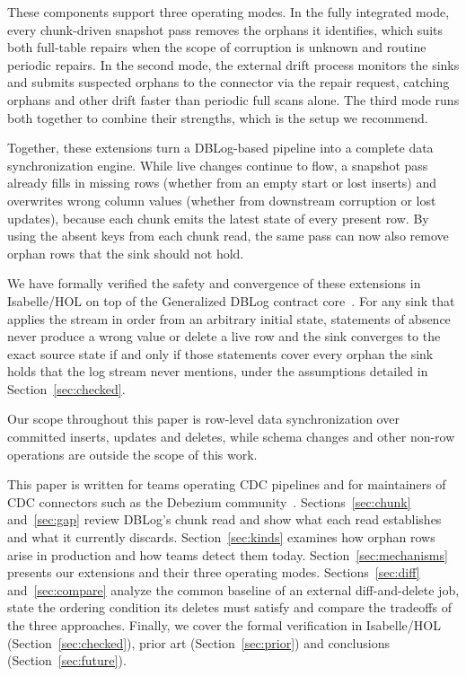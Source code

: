 \documentclass[sigconf,nonacm,10pt]{acmart}
\begin{document}
These components support three operating modes. In the fully integrated mode,
every chunk-driven snapshot pass removes the orphans it identifies, which suits
both full-table repairs when the scope of corruption is unknown and routine
periodic repairs. In the second mode, the external drift process monitors the
sinks and submits suspected orphans to the connector via the repair request,
catching orphans and other drift faster than periodic full scans alone. The
third mode runs both together to combine their strengths, which is the setup we
recommend.

Together, these extensions turn a DBLog-based pipeline into a complete data
synchronization engine. While live changes continue to flow, a snapshot pass already fills in missing rows (whether
from an empty start or lost inserts) and overwrites wrong column values (whether
from downstream corruption or lost updates), because each chunk emits the latest
state of every present row. By using the absent keys from each chunk read,
the same pass can now also remove orphan rows that the sink should not hold. 

We have formally verified the safety and convergence of these extensions in
Isabelle/HOL on top of the Generalized DBLog contract
core~\cite{andreakis2026generalized,generalized_dblog_artifact}. For any sink
that applies the stream in order from an arbitrary initial state, statements of
absence never produce a wrong value or delete a live row and the sink converges
to the exact source state if and only if those statements cover every orphan the
sink holds that the log stream never mentions, under the assumptions detailed in Section~\ref{sec:checked}.

Our scope throughout this paper is row-level data synchronization over committed
inserts, updates and deletes, while schema changes and other non-row operations
are outside the scope of this work.

This paper is written for teams operating CDC pipelines and for maintainers of CDC connectors 
such as the Debezium community~\cite{debezium_16_final,debezium_incremental_snapshots,andreakis2026generalized}. 
Sections~\ref{sec:chunk} and~\ref{sec:gap} review DBLog's chunk read and show what each read establishes and what it
currently discards. Section~\ref{sec:kinds} examines how orphan rows arise in
production and how teams detect them today. Section~\ref{sec:mechanisms}
presents our extensions and their three operating modes.
Sections~\ref{sec:diff} and~\ref{sec:compare} analyze the common baseline of an
external diff-and-delete job, state the ordering condition its deletes must
satisfy and compare the tradeoffs of the three approaches. Finally, we cover
the formal verification in Isabelle/HOL (Section~\ref{sec:checked}), prior art
(Section~\ref{sec:prior}) and conclusions (Section~\ref{sec:future}).
\end{document}
